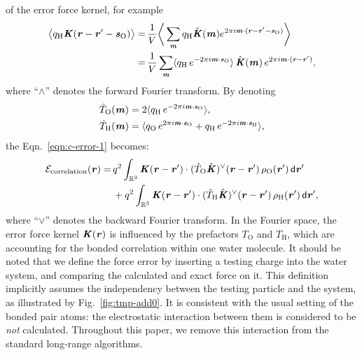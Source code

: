 \documentclass[aps,pre,preprint,unsortedaddress]{revtex4}
\newcommand{\recheck}[1]{{\color{red} #1}}
\renewcommand{\v}[1]{\textbf{\textit{#1}}}
\renewcommand{\d}[1]{\textsf{#1}}
\begin{document}
of the error force kernel, for example
\begin{align} \nonumber
  \big\langle
  q_{\textrm{H}}\v K(\v r - \v r' - \v s_{\textrm{O}})
  \big\rangle 
  =\,&
  \frac1V\bigg\langle
  \sum_{\v m}
  q_{\textrm{H}}\hat{\v K}(\v m)
  e^{2\pi i\v m\cdot(\v r - \v r' - \v s_{\textrm{O}})} 
  \bigg\rangle \\\nonumber
  =\,&
  \frac1V\sum_{\v m}
  \langle
  q_{\textrm{H}}\,e^{-2\pi i\v m\cdot\v s_{\textrm{O}}}
  \rangle\,
  \hat{\v K}(\v m)\,
  e^{2\pi i\v m\cdot(\v r - \v r')},
\end{align}
where ``$\wedge$'' denotes the forward Fourier transform. By denoting
\begin{align}\label{eqn:tom}
  \hat T_{\textrm{O}}(\v m)
  &= 
  2\langle
  q_{\textrm{H}}\,e^{-2\pi i\v m\cdot\v s_{\textrm{O}}}
  \rangle,\\\label{eqn:thm}
  \hat T_{\textrm{H}}(\v m)
  &= 
  \langle
  q_{\textrm{O}}\,e^{2\pi i\v m\cdot\v s_{\textrm{O}}} +
  q_{\textrm{H}}\,e^{-2\pi i\v m\cdot\v s_{\textrm{H}}}
  \rangle,
\end{align}
the Eqn.~\eqref{eqn:c-error-1} becomes:
\begin{align}\nonumber
  \mathcal E_{\textrm{correlation}}(\v r)
  =&\,
  q^2
  \int_{\mathbb R^3}
  \v K(\v r - \v r')\cdot
  (\hat T_{\textrm{O}}\hat{\v K})^{\vee}(\v r - \v r')
  \,\rho_{\textrm{O}}(\v r')
  \,\d d\v r' \\\label{eqn:c-error-water}
  & \,+
  q^2
  \int_{\mathbb R^3}
  \v K(\v r - \v r')\cdot
  (\hat T_{\textrm{H}}\hat{\v K})^{\vee}(\v r - \v r')
  \,\rho_{\textrm{H}}(\v r')
  \,\d d\v r',
\end{align}
where ``$\vee$'' denotes the backward Fourier transform.
In the Fourier space, the error force kernel $\v K(\v r)$ is
influenced by the prefactors $T_{\textrm{O}}$ and $T_{\textrm{H}}$,
which are accounting for the bonded correlation within one water
molecule. 
\recheck{
It should be noted that we define the force error by inserting a
testing charge into the water system, and comparing the
calculated and exact force on it. This definition implicitly assumes
the independency between the testing particle and the
system, as illustrated by Fig.~\ref{fig:tmp-add0}.
It is consistent
with the usual setting of the bonded pair atoms: the electrostatic interaction
between them is considered to be \emph{not} calculated.
Throughout this paper, we remove this  interaction from the
standard long-range algorithms.}
\end{document}
